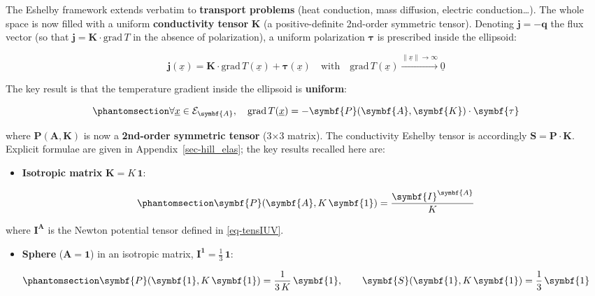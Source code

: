 \documentclass[
  a4paper,
  numbers=noendperiod,
  DIV=12]{scrreprt}
\providecommand{\tightlist}{%
  \setlength{\itemsep}{0pt}\setlength{\parskip}{0pt}}
\newcommand{\uu}[1]{{\symbf{{#1}}}}
\newcommand{\uv}[1]{{\underline{{#1}}}}
\newcommand{\x}{{\uv{{x}}}}
\newcommand{\norm}[1]{{\lVert{{#1}}\rVert}}
\begin{document}
The Eshelby framework extends verbatim to \textbf{transport problems}
(heat conduction, mass diffusion, electric conduction\ldots). The whole
space is now filled with a uniform \textbf{conductivity tensor}
\(\uu{K}\) (a positive-definite 2nd-order symmetric tensor). Denoting
\(\uu{j}=-\uu{q}\) the flux vector (so that
\(\uu{j}=\uu{K}\cdot\text{grad}\,T\) in the absence of polarization), a
uniform polarization \(\uu{\tau}\) is prescribed inside the ellipsoid:

\[
\uu{j}(\x) = \uu{K}\cdot\text{grad}\,T(\x) + \uu{\tau}(\x)
\quad\textrm{with}\quad
\text{grad}\,T(\x) \xrightarrow{\norm{\x}\to\infty} \uv{0}
\]

The key result is that the temperature gradient inside the ellipsoid is
\textbf{uniform}:

\begin{equation}\protect\phantomsection\label{eq-eshelby-cond}{
\forall\x\in\mathcal{E}_{\uu{A}},\quad
\text{grad}\,T(\x) = -\uu{P}(\uu{A},\uu{K})\cdot\uu{\tau}
}\end{equation}

where \(\uu{P}(\uu{A},\uu{K})\) is now a \textbf{2nd-order symmetric
tensor} (3×3 matrix). The conductivity Eshelby tensor is accordingly
\(\uu{S} = \uu{P}\cdot\uu{K}\). Explicit formulae are given in
Appendix~\ref{sec-hill_elas}; the key results recalled here are:

\begin{itemize}
\tightlist
\item
  \textbf{Isotropic matrix} \(\uu{K}=K\,\uu{1}\):
\end{itemize}

\begin{equation}\protect\phantomsection\label{eq-P2-iso}{
\uu{P}(\uu{A}, K\,\uu{1}) = \frac{\uu{I}^{\uu{A}}}{K}
}\end{equation}

where \(\uu{I}^{\uu{A}}\) is the Newton potential tensor defined in
\ref{eq-tensIUV}.

\begin{itemize}
\tightlist
\item
  \textbf{Sphere} (\(\uu{A}=\uu{1}\)) in an isotropic matrix,
  \(\uu{I}^{\uu{1}}=\frac{1}{3}\,\uu{1}\):
\end{itemize}

\begin{equation}\protect\phantomsection\label{eq-P2-sphere}{
\uu{P}(\uu{1}, K\,\uu{1}) = \frac{1}{3\,K}\,\uu{1}, \qquad
\uu{S}(\uu{1}, K\,\uu{1}) = \frac{1}{3}\,\uu{1}
}\end{equation}
\end{document}
